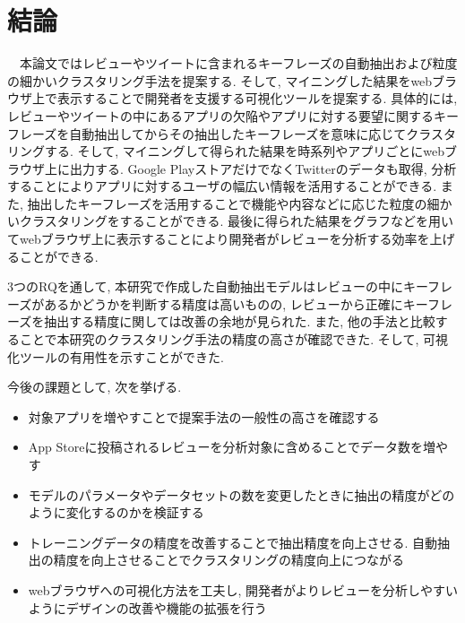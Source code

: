\chapter{結論}
\label{chap:keturon}

　本論文ではレビューやツイートに含まれるキーフレーズの自動抽出および粒度の細かいクラスタリング手法を提案する. そして, マイニングした結果をwebブラウザ上で表示することで開発者を支援する可視化ツールを提案する. 
具体的には, レビューやツイートの中にあるアプリの欠陥やアプリに対する要望に関するキーフレーズを自動抽出してからその抽出したキーフレーズを意味に応じてクラスタリングする.  そして, マイニングして得られた結果を時系列やアプリごとにwebブラウザ上に出力する.
Google PlayストアだけでなくTwitterのデータも取得, 分析することによりアプリに対するユーザの幅広い情報を活用することができる. また, 抽出したキーフレーズを活用することで機能や内容などに応じた粒度の細かいクラスタリングをすることができる. 最後に得られた結果をグラフなどを用いてwebブラウザ上に表示することにより開発者がレビューを分析する効率を上げることができる. 

3つのRQを通して, 本研究で作成した自動抽出モデルはレビューの中にキーフレーズがあるかどうかを判断する精度は高いものの, レビューから正確にキーフレーズを抽出する精度に関しては改善の余地が見られた. また, 他の手法と比較することで本研究のクラスタリング手法の精度の高さが確認できた. そして, 可視化ツールの有用性を示すことができた. 

今後の課題として, 次を挙げる. 

\begin{itemize}
    \item 対象アプリを増やすことで提案手法の一般性の高さを確認する
    \item App Storeに投稿されるレビューを分析対象に含めることでデータ数を増やす
    \item モデルのパラメータやデータセットの数を変更したときに抽出の精度がどのように変化するのかを検証する
    \item トレーニングデータの精度を改善することで抽出精度を向上させる. 自動抽出の精度を向上させることでクラスタリングの精度向上につながる
    \item webブラウザへの可視化方法を工夫し, 開発者がよりレビューを分析しやすいようにデザインの改善や機能の拡張を行う
\end{itemize}

